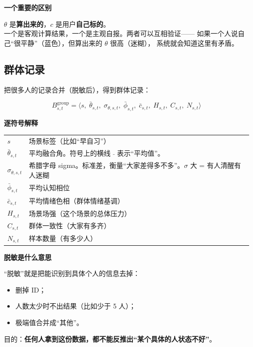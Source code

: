 \documentclass[UTF8,a4paper,11pt]{ctexart}
\newenvironment{explainbox}[1]
{\begin{center}\begin{minipage}{0.94\textwidth}\colorbox{boxbg}{\parbox{0.92\textwidth}{\textbf{#1}\par\vspace{2pt}}}}
{\end{minipage}\end{center}}
\newcommand{\hl}[1]{\textcolor{blue!70!black}{\textbf{#1}}}
\begin{document}
\begin{explainbox}{一个重要的区别}
$\theta$ 是\hl{算出来的}，$c$ 是用户\hl{自己标的}。\\
一个是客观计算结果，一个是主观自报。两者可以互相验证——
如果一个人说自己“很平静”（蓝色），但算出来的 $\theta$ 很高（迷糊），
系统就会知道这里有矛盾。
\end{explainbox}

\subsection{群体记录}

把很多人的记录合并（脱敏后），得到群体记录：

\begin{equation}
B^{\text{group}}_{s,t} = \big\langle
s,\; \bar{\theta}_{s,t},\; \sigma_{\theta,s,t},\; \bar{\phi}_{s,t},\;
\bar{c}_{s,t},\; H_{s,t},\; C_{s,t},\; N_{s,t}
\big\rangle
\label{p1:eq:group}
\end{equation}

\begin{explainbox}{逐符号解释}
\begin{longtable}{@{}p{2.4cm}p{11.4cm}@{}}
$s$ & 场景标签（比如“早自习”） \\
$\bar{\theta}_{s,t}$ & 平均融合角。符号上的横线 $\bar{\;}$ 表示“平均值”。 \\
$\sigma_{\theta,s,t}$ & 希腊字母 sigma。标准差，衡量“大家差得多不多”。$\sigma$ 大 = 有人清醒有人迷糊 \\
$\bar{\phi}_{s,t}$ & 平均认知相位 \\
$\bar{c}_{s,t}$ & 平均情绪色相（群体情绪基调） \\
$H_{s,t}$ & 场景场强（这个场景的总体压力） \\
$C_{s,t}$ & 群体一致性（大家有多齐） \\
$N_{s,t}$ & 样本数量（有多少人） \\
\end{longtable}
\end{explainbox}

\begin{explainbox}{脱敏是什么意思}
“脱敏”就是把能识别到具体个人的信息去掉：
\begin{itemize}[leftmargin=1.4em,itemsep=1pt]
\item 删掉 ID；
\item 人数太少时不出结果（比如少于 5 人）；
\item 极端值合并成“其他”。
\end{itemize}
目的：\hl{任何人拿到这份数据，都不能反推出“某个具体的人状态不好”}。
\end{explainbox}
\end{document}
